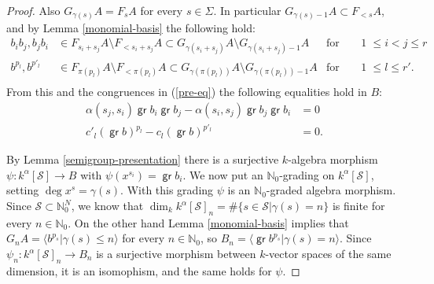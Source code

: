 \documentclass[11pt,fleqn]{article}
\theoremstyle{plain}
\theoremstyle{remark}
\theoremstyle{definition}
\newcommand\NN{\mathbb N}
\renewcommand\to{\longrightarrow}
\renewcommand\S{\mathcal S}
\DeclareMathOperator\gr{\mathsf{gr}}
\begin{document}
\begin{proof}
Also $G_{\gamma(s)}A = F_sA$ for every $s \in \Sigma$. In particular $G_{\gamma(s)-1}A
\subset F_{<s}A$, and by Lemma \ref{monomial-basis} the following hold:
\begin{align*}
b_i b_j, b_j b_i &\in F_{s_i + s_j}A \setminus F_{<s_i + s_j}A \subset G_{\gamma(s_i +
s_j)}A \setminus G_{\gamma(s_i + s_j)-1}A &\mbox{for every } 1 &\leq i < j \leq r \\
b^{p_l}, b^{p'_l} & \in F_{\pi(p_l)}A \setminus F_{<\pi(p_l)}A \subset G_{\gamma(\pi(p_l))}A
\setminus G_{\gamma(\pi(p_l)) -1}A & \mbox{for every } 1 &\leq l \leq r'.\\
\end{align*}
From this and the congruences in (\ref{pre-eq}) the following equalities hold in $B$:
\begin{align*}
  \alpha(s_j,s_i) \gr b_i \gr b_j - \alpha(s_i,s_j) \gr b_j \gr b_i &= 0 \\
 c'_l (\gr b)^{p_l} - c_l (\gr b)^{p'_l} &= 0.
\end{align*}

By Lemma \ref{semigroup-presentation} there is a surjective $k$-algebra morphism $\psi: 
k^\alpha[\S] \to B$ with $\psi(x^{s_i}) = \gr b_{i}$. We now put an $\NN_0$-grading on
$k^\alpha[\S]$, setting $\deg x^s = \gamma(s)$. With this grading $\psi$ is an
$\NN_0$-graded algebra morphism. Since $\S \subset \NN_0^N$, we know that $\dim_k 
k^\alpha[\S]_n = \#\{s \in \S|\gamma(s) = n\}$ is finite for every $n \in \NN_0$. On the
other hand Lemma \ref{monomial-basis} implies that $G_nA = \langle b^{p_s}|\gamma(s) \leq
n \rangle$ for every $n \in \NN_0$, so $B_n = \langle \gr b^{p_s}| \gamma(s) = n \rangle$. 
Since $\psi_n: k^\alpha[\S]_n \to B_n$ is a surjective morphism between $k$-vector spaces
of the same dimension, it is an isomophism, and the same holds for $\psi$.
\end{proof}
\end{document}
